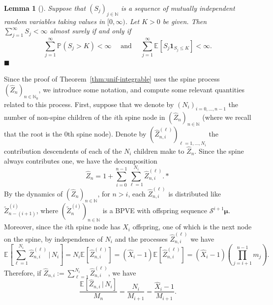 \documentclass[12pt]{article}
\newtheorem{lem}[thm]{Lemma}
\theoremstyle{definition}
\newcommand{\E}[2][]{\ensuremath{\mathbb{E}_{#1}\left[#2 \right]}}
\newcommand{\Prob}[2][]{\ensuremath{\mathbb{P}_{#1} \left(#2 \right)}}
\begin{document}
\begin{lem}[{\cite[Theorem~6.2]{petrov1995limit}}] \label{lem:three-series-positive}
    Suppose that $(S_{j})_{j \in \mathbb{N}}$ is a sequence of mutually independent random variables taking values in $[0, \infty)$. Let $K > 0$ be given. Then $\sum_{j=1}^{\infty} S_{j} < \infty$ almost surely if and only if 
    \begin{equation} \label{eq:kolmogorov-three-series-positive}
        \sum_{j=1}^{\infty} \Prob{S_{j} > K} < \infty \quad \text{ and } \quad \sum_{j=1}^{\infty} \E{S_{j} \mathbf{1}_{S_{j} \leq K}} < \infty. 
    \end{equation}
    \hfill $\blacksquare$
\end{lem}



Since the proof of Theorem~\ref{thm:unif-integrable} uses the spine process $(\widehat{Z}_{n})_{n \in \mathbb{N}_0}$, we introduce some notation, and compute some relevant quantities related to this process. First, suppose that we denote by $(N_{i})_{i = 0, \ldots, n-1}$ the number of non-spine children of the $i$th spine node in $(\widehat{Z}_{n})_{n \in \mathbb{N}}$ (where we recall that the root is the $0$th spine node). Denote by $(\widehat{Z}^{(\ell)}_{n, i})_{\ell= 1, \ldots, N_{i}}$ the contribution descendents of each of the $N_{i}$ children make to $\widehat{Z}_{n}$. Since the spine always contributes one, we have the decomposition
\begin{equation} \label{eq:spine-sum-decomp}
    \widehat{Z}_{n} = 1 +  \sum_{i=0}^{n-1} \sum_{\ell = 1}^{N_{i}} \widehat{Z}^{(\ell)}_{n,i}. 
*\end{equation}
By the dynamics of $(\widehat{Z}_{n})_{n \in \mathbb{N}}$, for $n > i$, each $\widehat{Z}^{(\ell)}_{n, i}$ is distributed like $\tilde{Z}^{(i)}_{n-(i+1)}$, where $(\tilde{Z}^{(i)}_{n})_{n \in \mathbb{N}}$ is a BPVE with offspring sequence $\mathcal{S}^{i+1}\boldsymbol{\mu}$. Moreover, since the $i$th spine node has $\widehat{X}_{i}$ offspring, one of which is the next node on the spine, by independence of $N_{i}$ and the processes $\widehat{Z}^{(\ell)}_{n,i}$ we have 
\[
\E{\sum_{\ell = 1}^{N_{i}} \widehat{Z}^{(\ell)}_{n,i} \, \bigg | \, N_{i}} = N_i \E{\widehat{Z}^{(\ell)}_{n,i}} =  \left(\widehat{X}_{i} - 1 \right) \E{\widehat{Z}^{(\ell)}_{n,i}} = \left(\widehat{X}_{i} - 1\right) \left(\prod_{j=i+1}^{n-1} m_{j} \right).
\] 
Therefore, if $\widehat{Z}_{n,i} := \sum_{\ell = 1}^{N_{i}} \widehat{Z}^{(\ell)}_{n, i}$, we have 
\begin{equation} \label{eq:martingale-property-requirement}
\frac{\E{\widehat{Z}_{n,i} \, \big | \, N_{i}}}{M_n} = \frac{N_{i}}{M_{i+1}} = \frac{\widehat{X}_i - 1}{M_{i+1}}. 
\end{equation}
\end{document}
